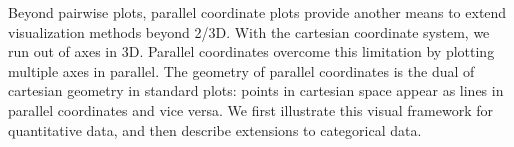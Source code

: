 \documentclass[11pt]{book}\usepackage[]{graphicx}\usepackage[]{color}
\begin{document}

Beyond pairwise plots, parallel coordinate plots 
\citep{Inselberg:1985,Inselberg:1989,Wegman:1990}
provide another means to
extend visualization methods beyond 2/3D. With the cartesian coordinate
system, we run out of axes in 3D.  Parallel coordinates overcome this
limitation by plotting multiple axes in parallel.
The geometry of parallel coordinates is the dual of cartesian
geometry in standard plots: points in cartesian space appear as lines
in parallel coordinates and vice versa.
We first illustrate this visual framework for quantitative data, and
then describe extensions to categorical data.
\end{document}
